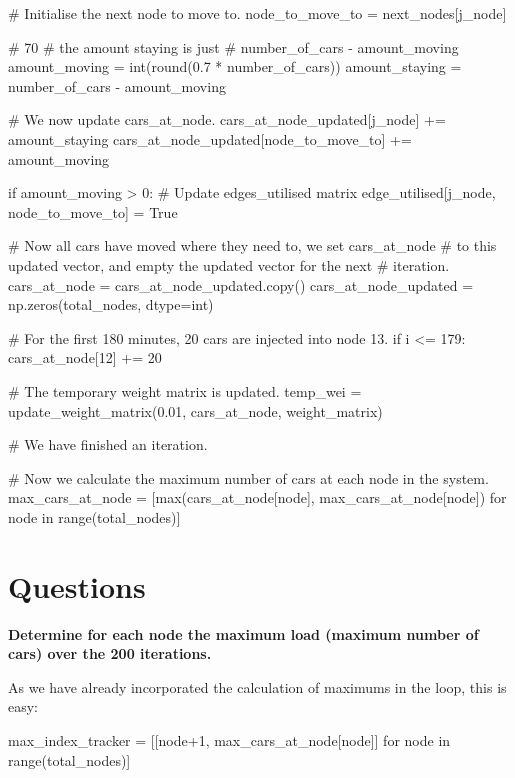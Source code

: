 \documentclass[paper=a4, fontsize=12pt]{scrartcl} %
\numberwithin{equation}{section}       %
\numberwithin{figure}{section}         %
\numberwithin{table}{section}          %
\begin{document}
\begin{python}
                # Initialise the next node to move to.
                node_to_move_to = next_nodes[j_node]

                # 70%
                # the amount staying is just 
                # number_of_cars - amount_moving
                amount_moving = int(round(0.7 * number_of_cars))
                amount_staying = number_of_cars - amount_moving

                # We now update cars_at_node.
                cars_at_node_updated[j_node] += amount_staying
                cars_at_node_updated[node_to_move_to] += amount_moving

                if amount_moving > 0:
                    # Update edges_utilised matrix
                    edge_utilised[j_node, node_to_move_to] = True

        # Now all cars have moved where they need to, we set cars_at_node
        # to this updated vector, and empty the updated vector for the next
        # iteration.
        cars_at_node = cars_at_node_updated.copy()
        cars_at_node_updated = np.zeros(total_nodes, dtype=int)

        # For the first 180 minutes, 20 cars are injected into node 13.
        if i <= 179:
            cars_at_node[12] += 20

        # The temporary weight matrix is updated.
        temp_wei = update_weight_matrix(0.01, cars_at_node, weight_matrix)

        # We have finished an iteration.

       # Now we calculate the maximum number of cars at each node in the system.
        max_cars_at_node = [max(cars_at_node[node], max_cars_at_node[node]) 
                            for node in range(total_nodes)]
\end{python}

\section{Questions}

\textbf{Determine for each node the maximum load (maximum number of cars) over the 200 iterations.}
\newline

As we have already incorporated the calculation of maximums in the loop, this is easy:

\begin{python}
max_index_tracker = [[node+1, max_cars_at_node[node]]
                         for node in range(total_nodes)]
\end{python}
\end{document}
